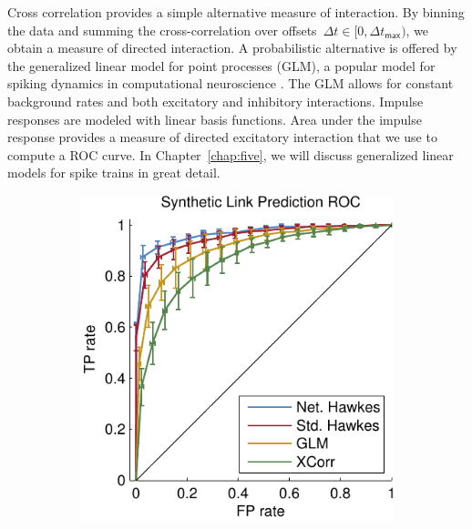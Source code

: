 Cross correlation provides a simple alternative measure of
interaction. By binning the data and summing the cross-correlation
over offsets~${\Delta t\in[0,\Delta t_{\mathsf{max}})}$, we obtain a
  measure of directed interaction. A probabilistic alternative is
  offered by the generalized linear model for point processes (GLM), a
  popular model for spiking dynamics in computational neuroscience
  \citep{Paninski-2004}. The GLM allows for constant background rates
  and both excitatory and inhibitory interactions. Impulse responses
  are modeled with linear basis functions. Area under the impulse
  response provides a measure of directed excitatory interaction that
  we use to compute a ROC curve. In Chapter~\ref{chap:five}, we will
  discuss generalized linear models for spike trains in great detail.
\begin{figure}[t]
  \begin{center}
  \begin{subfigure}[T]{.4\textwidth}
    \caption{}
    \includegraphics[width=\textwidth]{figures/ch3/synth_link_pred} 
    \label{fig:synth_link_pred}
  \end{subfigure}
  ~ ~ ~ ~
  \begin{subfigure}[T]{.4\textwidth}
    \caption{}

\end{subfigure}
\end{center}
\end{figure}
